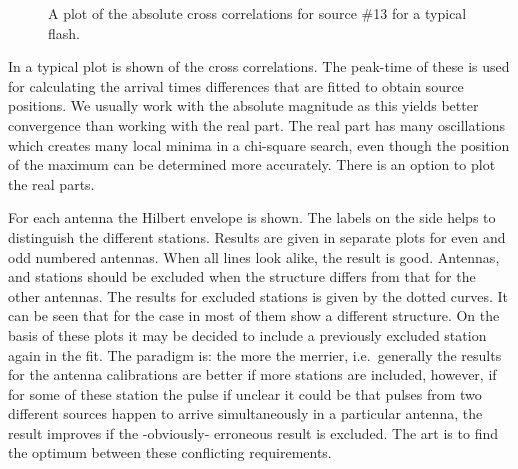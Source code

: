 \begin{figure}[th]
	\caption{A plot of the absolute cross correlations for source \#13 for a typical flash.}	 
\end{figure}

In  a typical plot is shown of the cross correlations. The peak-time of these is used for calculating the arrival times differences that are fitted to obtain source positions. We usually work with the absolute magnitude as this yields better convergence than working with the real part. The real part has many oscillations which creates many local minima in a chi-square search, even though the position of the maximum can be determined more accurately. There is an option to plot the real parts.

For each antenna the Hilbert envelope is shown. The labels on the side helps to distinguish the different stations. Results are given in separate plots for even and odd numbered antennas. When all lines look alike, the result is good. Antennas, and stations should be excluded when the structure differs from that for the other antennas. The results for excluded stations is given by the dotted curves. It can be seen that for the case in  most of them show a different structure. On the basis of these plots it may be decided to include a previously excluded station again in the fit. The paradigm is: the more the merrier, i.e.\ generally the results for the antenna calibrations are better if more stations are included, however, if for some of these station the pulse if unclear it could be that pulses from two different sources happen to arrive simultaneously in a particular antenna, the result improves if the -obviously- erroneous result is excluded. The art is to find the optimum between these conflicting requirements.


